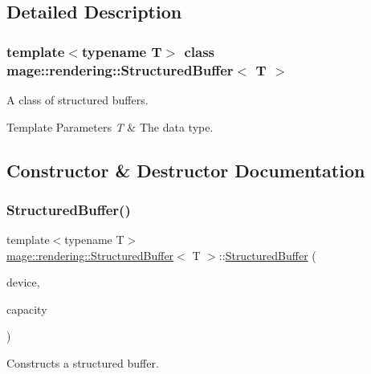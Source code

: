 \subsection{Detailed Description}
\subsubsection*{template$<$typename T$>$\newline
class mage\+::rendering\+::\+Structured\+Buffer$<$ T $>$}

A class of structured buffers.


\begin{DoxyTemplParams}{Template Parameters}
{\em T} & The data type. \\
\hline
\end{DoxyTemplParams}


\subsection{Constructor \& Destructor Documentation}
\mbox{\label{classmage_1_1rendering_1_1_structured_buffer_a9a8b0c65fb342896dd9e123e59db5526}} 
\subsubsection{\texorpdfstring{Structured\+Buffer()}{StructuredBuffer()}\hspace{0.1cm}{\footnotesize\ttfamily [1/3]}}
{\footnotesize\ttfamily template$<$typename T$>$ \\
\mbox{\hyperlink{classmage_1_1rendering_1_1_structured_buffer}{mage\+::rendering\+::\+Structured\+Buffer}}$<$ T $>$\+::\mbox{\hyperlink{classmage_1_1rendering_1_1_structured_buffer}{Structured\+Buffer}} (\begin{DoxyParamCaption}\item[{I\+D3\+D11\+Device \&}]{device,  }\item[{size\+\_\+t}]{capacity }\end{DoxyParamCaption})\hspace{0.3cm}{\ttfamily [explicit]}}

Constructs a structured buffer.


